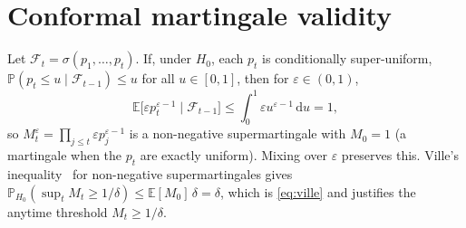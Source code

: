 \documentclass[sigconf]{aamas}
\begin{document}
\section{Conformal martingale validity}
\label{app:martingale}
Let $\mathcal{F}_t=\sigma(p_1,\dots,p_t)$. If, under $H_0$, each $p_t$ is
conditionally super-uniform, $\mathbb{P}(p_t\le u\mid\mathcal{F}_{t-1})\le u$ for
all $u\in[0,1]$, then for $\varepsilon\in(0,1)$,
\[
\mathbb{E}\big[\varepsilon p_t^{\varepsilon-1}\mid\mathcal{F}_{t-1}\big]
\le\int_0^1\varepsilon u^{\varepsilon-1}\,\mathrm{d}u=1,
\]
so $M_t^{\varepsilon}=\prod_{j\le t}\varepsilon p_j^{\varepsilon-1}$ is a
non-negative supermartingale with $M_0=1$ (a martingale when the $p_t$ are exactly
uniform). Mixing over $\varepsilon$ preserves this. Ville's
inequality~\cite{ville1939etude} for non-negative supermartingales gives
$\mathbb{P}_{H_0}(\sup_{t}M_t\ge1/\delta)\le\mathbb{E}[M_0]\,\delta=\delta$,
which is \eqref{eq:ville} and justifies the anytime threshold $M_t\ge1/\delta$.
\end{document}
